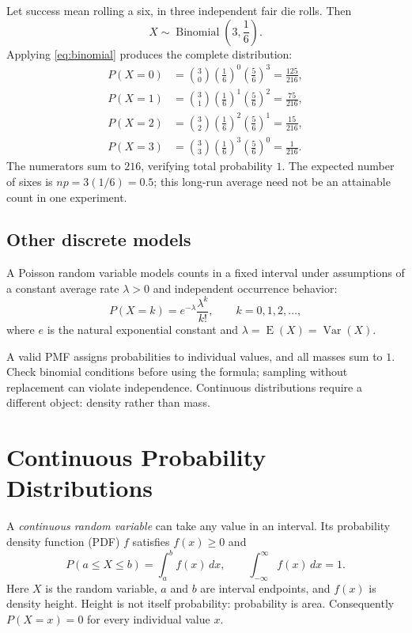 \documentclass[11pt]{article}
\newcommand{\E}{\operatorname{E}}
\newcommand{\Var}{\operatorname{Var}}
\begin{document}
Let success mean rolling a six, in three independent fair die rolls.  Then
\[
X\sim\operatorname{Binomial}\left(3,\frac16\right).
\]
Applying \eqref{eq:binomial} produces the complete distribution:
\begin{align*}
P(X=0)&=\binom30\left(\frac16\right)^0\left(\frac56\right)^3=\frac{125}{216},\\
P(X=1)&=\binom31\left(\frac16\right)^1\left(\frac56\right)^2=\frac{75}{216},\\
P(X=2)&=\binom32\left(\frac16\right)^2\left(\frac56\right)^1=\frac{15}{216},\\
P(X=3)&=\binom33\left(\frac16\right)^3\left(\frac56\right)^0=\frac{1}{216}.
\end{align*}
The numerators sum to $216$, verifying total probability $1$.  The expected
number of sixes is $np=3(1/6)=0.5$; this long-run average need not be an
attainable count in one experiment.

\subsection{Other discrete models}
A Poisson random variable models counts in a fixed interval under assumptions
of a constant average rate $\lambda>0$ and independent occurrence behavior:
\[
P(X=k)=e^{-\lambda}\frac{\lambda^k}{k!},\qquad k=0,1,2,\ldots,
\]
where $e$ is the natural exponential constant and $\lambda=\E(X)=\Var(X)$.

\begin{keybox}
A valid PMF assigns probabilities to individual values, and all masses sum
to $1$.  Check binomial conditions before using the formula; sampling without
replacement can violate independence.  Continuous distributions require a
different object: density rather than mass.
\end{keybox}

\section{Continuous Probability Distributions}\label{sec:continuous}
A \emph{continuous random variable} can take any value in an interval.  Its
probability density function (PDF) $f$ satisfies $f(x)\ge0$ and
\begin{equation}\label{eq:density}
P(a\le X\le b)=\int_a^b f(x)\,dx,
\qquad \int_{-\infty}^{\infty}f(x)\,dx=1.
\end{equation}
Here $X$ is the random variable, $a$ and $b$ are interval endpoints, and
$f(x)$ is density height.  Height is not itself probability: probability is
area.  Consequently $P(X=x)=0$ for every individual value $x$.
\end{document}
